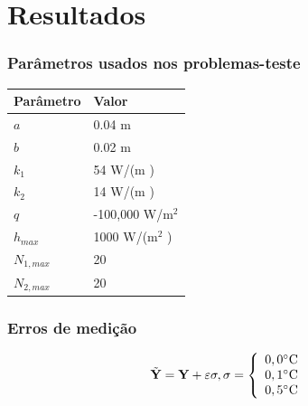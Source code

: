 \documentclass{beamer}
\begin{document}
\section{Resultados}
\begin{frame}
	\frametitle{Parâmetros usados nos problemas-teste}
	\begin{table}[H]
		\centering
		\begin{tabular}{|l|l|}
			\hline
			\textbf{Parâmetro} & \textbf{Valor}  \\ \hline
			$a$       & 0.04 m   \\ \hline
			$b$       & 0.02 m     \\ \hline
			$k_1$     & 54 W/(m \celsius)  \\ \hline
			$k_2$     & 14 W/(m \celsius) \\ \hline
			$q$       & -100,000 W/$\text{m}^2$ \\ \hline
			$h_{max}$       & 1000 W/($\text{m}^2$ \celsius) \\ \hline
			$N_{1,max}$       & 20 \\ \hline
			$N_{2,max}$       & 20 \\ \hline
		\end{tabular}		
		\label{tabela_params}
	\end{table}
\end{frame}



\begin{frame}
	\frametitle{Erros de medição}
	\begin{center}
		\begin{align*}
		& \tilde{\mathbf{Y}} = \mathbf{Y} + \mathbf{\varepsilon} \sigma, \sigma = 
		\left\lbrace \begin{array}{ll}
		0,0\celsius \\
		0,1\celsius \\
		0,5\celsius
		\end{array}\right .
		\end{align*}
	\end{center}
\end{frame}




\end{document}
